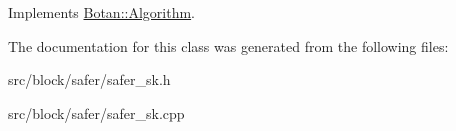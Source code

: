 Implements \hyperlink{classBotan_1_1Algorithm_a42d3ee39e051eba01ecace201fe1e6fd}{Botan\-::\-Algorithm}.



The documentation for this class was generated from the following files\-:\begin{DoxyCompactItemize}
\item 
src/block/safer/safer\-\_\-sk.\-h\item 
src/block/safer/safer\-\_\-sk.\-cpp\end{DoxyCompactItemize}
